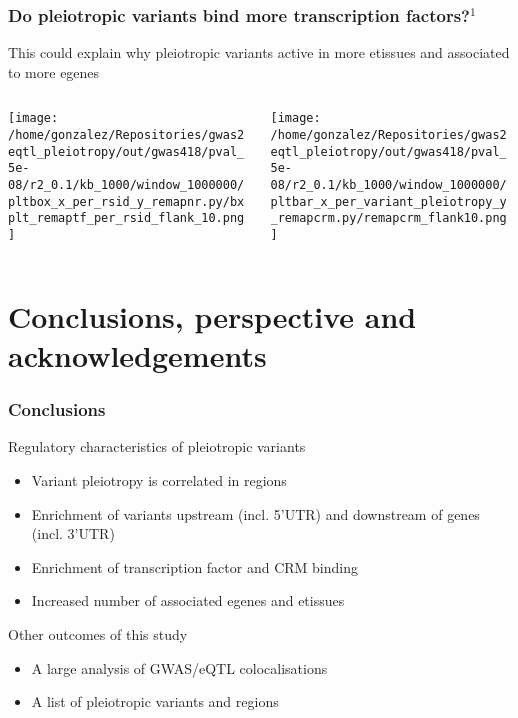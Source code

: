 \documentclass{beamer}
\begin{document}
\begin{frame}
\frametitle{Do pleiotropic variants bind more transcription factors?$^1$}

This could explain why pleiotropic variants active in more etissues and associated to more egenes

\begin{columns}
\begin{column}{0.5\textwidth}
    \begin{center}
\texttt{[image: /home/gonzalez/Repositories/gwas2eqtl\_pleiotropy/out/gwas418/pval\_5e-08/r2\_0.1/kb\_1000/window\_1000000/pltbox\_x\_per\_rsid\_y\_remapnr.py/bxplt\_remaptf\_per\_rsid\_flank\_10.png]}
     \end{center}
\end{column}
\begin{column}{0.5\textwidth}  %
    \begin{center}
\texttt{[image: /home/gonzalez/Repositories/gwas2eqtl\_pleiotropy/out/gwas418/pval\_5e-08/r2\_0.1/kb\_1000/window\_1000000/pltbar\_x\_per\_variant\_pleiotropy\_y\_remapcrm.py/remapcrm\_flank10.png]}
     \end{center}
\end{column}
\end{columns}

\end{frame}

\let\thefootnote\relax{}

\section{Conclusions, perspective and acknowledgements} %

\begin{frame}
\frametitle{Conclusions}

Regulatory characteristics of pleiotropic variants
%
\begin{itemize}
\item Variant pleiotropy is correlated in regions
\item Enrichment of variants upstream (incl. 5'UTR) and downstream of genes (incl. 3'UTR)
\item Enrichment of transcription factor and CRM binding
\item Increased number of associated egenes and etissues
\end{itemize}
%
\vfill
%
Other outcomes of this study
%
\begin{itemize}
\item A large analysis of GWAS/eQTL colocalisations
\item A list of pleiotropic variants and regions
\end{itemize}

\end{frame}
\end{document}
